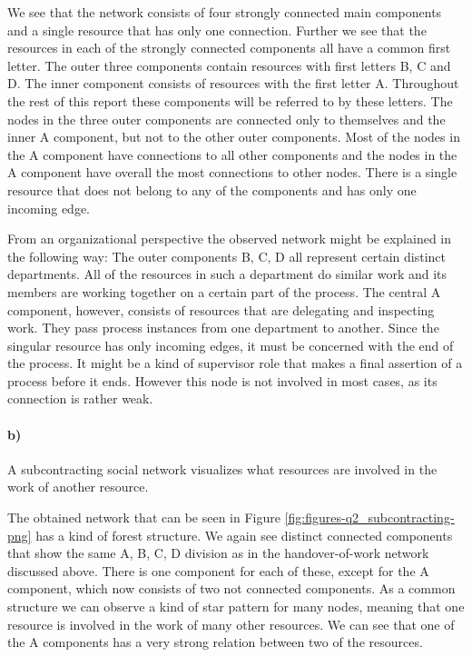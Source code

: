 \documentclass[12pt]{report}
\begin{document}
We see that the network consists of four strongly connected main components and a single resource that has only one connection. Further we see that the resources in each of the strongly connected components all have a common first letter. The outer three components contain resources with first letters B, C and D. The inner component consists of resources with the first letter A. Throughout the rest of this report these components will be referred to by these letters. The nodes in the three outer components are connected only to themselves and the inner A component, but not to the other outer components. Most of the nodes in the A component have connections to all other components and the nodes in the A component have overall the most connections to other nodes. There is a single resource that does not belong to any of the components and has only one incoming edge.

From an organizational perspective the observed network might be explained in the following way: The outer components B, C, D all represent certain distinct departments. All of the resources in such a department do similar work and its members are working together on a certain part of the process. The central A component, however, consists of resources that are delegating and inspecting work. They pass process instances from one department to another. Since the singular resource has only incoming edges, it must be concerned with the end of the process. It might be a kind of supervisor role that makes a final assertion of a process before it ends. However this node is not involved in most cases, as its connection is rather weak.

\paragraph{b)} 

A subcontracting social network visualizes what resources are involved in the work of another resource.

The obtained network that can be seen in Figure \ref{fig:figures-q2_subcontracting-png} has a kind of forest structure. We again see distinct connected components that show the same A, B, C, D division as in the handover-of-work network discussed above. There is one component for each of these, except for the A component, which now consists of two not connected components. As a common structure we can observe a kind of star pattern for many nodes, meaning that one resource is involved in the work of many other resources. We can see that one of the A components has a very strong relation between two of the resources.
\end{document}
